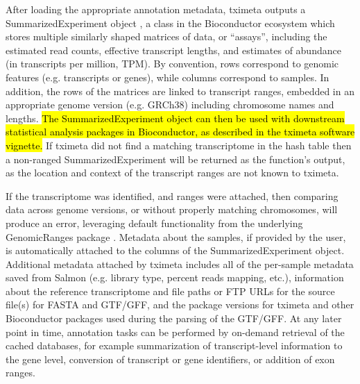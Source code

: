After loading the appropriate annotation metadata, tximeta outputs a
SummarizedExperiment object \cite{granges}, a class in the
Bioconductor ecosystem which stores multiple similarly shaped matrices
of data, or ``assays'', including the estimated read counts, effective
transcript lengths, and estimates of abundance (in transcripts per
million, TPM). By convention, rows correspond to genomic features
(e.g. transcripts or genes), while columns correspond to samples. In
addition, the rows of the matrices are linked to transcript ranges,
embedded in an appropriate genome version (e.g. GRCh38) including
chromosome names and lengths. \hl{The SummarizedExperiment object can
then be used with downstream statistical analysis packages in
Bioconductor, as described in the tximeta software vignette.}
If tximeta did not find a matching transcriptome in the hash table
then a non-ranged SummarizedExperiment will be returned as the
function's output, as the location and context of the transcript
ranges are not known to tximeta.

If the transcriptome was identified, and ranges were attached, then
comparing data across genome versions, or without properly matching
chromosomes, will produce an error, leveraging default functionality
from the underlying GenomicRanges package \cite{granges}. Metadata
about the samples, if provided by the user, is automatically attached
to the columns of the SummarizedExperiment object. Additional metadata
attached by tximeta includes all of the per-sample metadata saved from
Salmon (e.g. library type, percent reads mapping, etc.), information
about the reference transcriptome and file paths or FTP URLs for the source file(s)
for FASTA and GTF/GFF, and the package versions for tximeta and other
Bioconductor packages used during the parsing of the GTF/GFF. At any
later point in time, annotation tasks can be performed by on-demand
retrieval of the cached databases, for example summarization of
transcript-level information to the gene level, conversion of
transcript or gene identifiers, or addition of exon ranges.

